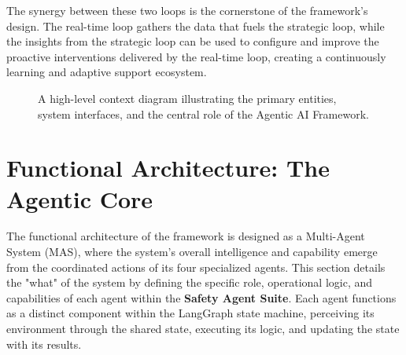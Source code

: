 The synergy between these two loops is the cornerstone of the framework's design. The real-time loop gathers the data that fuels the strategic loop, while the insights from the strategic loop can be used to configure and improve the proactive interventions delivered by the real-time loop, creating a continuously learning and adaptive support ecosystem.

\begin{figure}[h]
    \centering
    \caption{A high-level context diagram illustrating the primary entities, system interfaces, and the central role of the Agentic AI Framework.}
    \label{fig:context_diagram}
\end{figure}


\section{Functional Architecture: The Agentic Core}
\label{chap:functional_architecture}

The functional architecture of the framework is designed as a Multi-Agent System (MAS), where the system's overall intelligence and capability emerge from the coordinated actions of its four specialized agents. This section details the "what" of the system by defining the specific role, operational logic, and capabilities of each agent within the \textbf{Safety Agent Suite}. Each agent functions as a distinct component within the LangGraph state machine, perceiving its environment through the shared state, executing its logic, and updating the state with its results.

